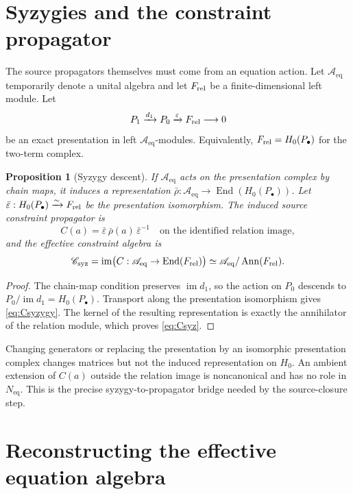 \documentclass[11pt]{amsart}
\newtheorem{proposition}[theorem]{Proposition}
\theoremstyle{definition}
\newcommand{\im}{\operatorname{im}}
\newcommand{\End}{\operatorname{End}}
\newcommand{\Aeq}{\mathscr A_{\mathrm{eq}}}
\newcommand{\Neq}{N_{\mathrm{eq}}}
\newcommand{\Csyz}{\mathscr C_{\mathrm{syz}}}
\begin{document}
\section{Syzygies and the constraint propagator}\label{sec:syzygy}

The source propagators themselves must come from an equation action. Let \(\Aeq\) temporarily denote
a unital algebra and let \(F_{\rm rel}\) be a finite-dimensional left module. Let
\[
P_1\xrightarrow{d_1}P_0\xrightarrow{\varepsilon}F_{\rm rel}\longrightarrow 0
\]
be an exact presentation in left \(\Aeq\)-modules. Equivalently,
\(F_{\rm rel}=H_0(P_\bullet)\) for the two-term complex.

\begin{proposition}[Syzygy descent]
If \(\Aeq\) acts on the presentation complex by chain maps, it induces a representation
\(\bar\rho:\Aeq\to\End(H_0(P_\bullet))\). Let
\(\bar\varepsilon:H_0(P_\bullet)\xrightarrow{\sim}F_{\rm rel}\)
be the presentation isomorphism. The induced source constraint
propagator is
\begin{equation}
C(a)=\bar\varepsilon\,\bar\rho(a)\,\bar\varepsilon^{-1}
\quad\text{on the identified relation image},
\label{eq:Csyzygy}
\end{equation}
and the effective constraint algebra is
\begin{equation}
\Csyz=\im\bigl(C:\Aeq\to\End(F_{\rm rel})\bigr)
\simeq\Aeq/\operatorname{Ann}(F_{\rm rel}).
\label{eq:Csyz}
\end{equation}
\end{proposition}

\begin{proof}
The chain-map condition preserves \(\im d_1\), so the action on \(P_0\) descends to
\(P_0/\im d_1=H_0(P_\bullet)\). Transport along the presentation isomorphism gives
\eqref{eq:Csyzygy}. The kernel of the resulting representation is exactly the annihilator of the
relation module, which proves \eqref{eq:Csyz}.
\end{proof}

Changing generators or replacing the presentation by an isomorphic presentation complex changes matrices but
not the induced representation on \(H_0\). An ambient extension of \(C(a)\) outside the relation
image is noncanonical and has no role in \(\Neq\). This is the precise syzygy-to-propagator bridge
needed by the source-closure step.

\section{Reconstructing the effective equation algebra}
\end{document}
